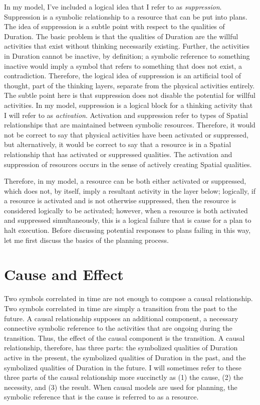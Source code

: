In my model, I've included a logical idea that I refer to as
\emph{suppression}.  Suppression is a symbolic relationship to a
resource that can be put into plans.  The idea of suppression is a
subtle point with respect to the qualities of Duration.  The basic
problem is that the qualities of Duration are the willful activities
that exist without thinking necessarily existing.  Further, the
activities in Duration cannot be inactive, by definition; a symbolic
reference to something inactive would imply a symbol that refers to
something that does not exist, a contradiction.  Therefore, the
logical idea of suppression is an artificial tool of thought, part of
the thinking layers, separate from the physical activities entirely.
The subtle point here is that suppression does not disable the
potential for willful activities.  In my model, suppression is a
logical block for a thinking activity that I will refer to as
\emph{activation}.  Activation and suppression refer to types of
Spatial relationships that are maintained between symbolic resources.
Therefore, it would not be correct to say that physical activities
have been activated or suppressed, but alternatively, it would be
correct to say that a resource is in a Spatial relationship that has
activated or suppressed qualities.  The activation and suppression of
resources occurs in the sense of actively creating Spatial qualities.

Therefore, in my model, a resource can be both either activated or
suppressed, which does not, by itself, imply a resultant activity in
the layer below; logically, if a resource is activated and is not
otherwise suppressed, then the resource is considered logically to be
activated; however, when a resource is both activated and suppressed
simultaneously, this is a logical failure that is cause for a plan to
halt execution.  Before discussing potential responses to plans
failing in this way, let me first discuss the basics of the planning
process.

\section{Cause and Effect}

Two symbols correlated in time are not enough to compose a causal
relationship.  Two symbols correlated in time are simply a transition
from the past to the future.  A causal relationship supposes an
additional component, a necessary connective symbolic reference to the
activities that are ongoing during the transition.  Thus, the effect
of the causal component is the transition.  A causal relationship,
therefore, has three parts: the symbolized qualities of Duration
active in the present, the symbolized qualities of Duration in the
past, and the symbolized qualities of Duration in the future.  I will
sometimes refer to these three parts of the causal relationship more
succinctly as (1) the cause, (2) the necessity, and (3) the result.
When causal models are used for planning, the symbolic reference that
is the cause is referred to as a resource.

